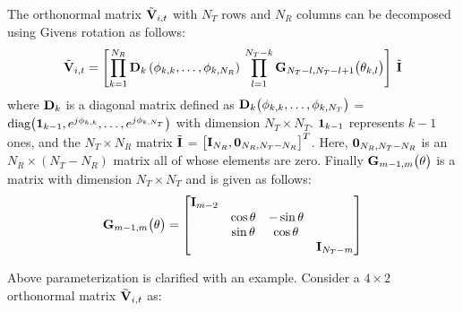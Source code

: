 \documentclass[11pt,a4paper]{report}
\def\bD{{\bf D}}
\def\bG{{\bf G}}
\def\bI{{\bf I}}
\def\bV{{\bf V}}
\begin{document}
The orthonormal matrix $\tilde{\bV}_{i,t}$ with $N_T$ rows and $N_R$ columns
can be decomposed using Givens rotation as follows:
\begin{equation}
\label{eq:decompose}
\tilde{\bV}_{i,t} = \left[\prod_{k=1}^{N_{R}} \bD_{k} \left( \phi_{k,k},\ldots , \phi_{k,N_{R}} \right) \:  \prod_{l=1}^{N_{T}-k} \bG_{N_{T}-l,N_{T} -l+1} \big( \theta_{k,l}\big)  \right] \: \tilde{\bI}
\end{equation}
where $\bD_{k}$ is a diagonal matrix defined as
$\bD_{k}\big(\phi_{k,k}, \ldots, \phi_{k,N_T } \big)$ =
$\mbox{diag}\big( {\bf 1}_{k-1}, e^{j\phi_{k,k}},\ldots,
e^{j\phi_{k,N_T }} \big)$ with  dimension $N_T \times N_T$. ${\bf 1}_{k-1}$ represents $k-1$ ones,
and the $N_T \times N_R$ matrix $\tilde{\bI}$ =
$\big[\bI_{N_R }, {\bf 0}_{N_R ,N_T -N_R}\big]^{T}$. Here,
${\bf 0}_{N_R ,N_T -N_R }$ is an $N_R\times (N_T - N_R)$ matrix all of
whose elements are zero.
Finally $\bG_{m-1,m}\big(\theta\big)$ is a matrix with dimension $N_T \times N_T$ and is given as follows:
\begin{equation}
\bG_{m-1,m}\big(\theta\big)  =
\begin{bmatrix}
\bI_{m-2} & & & \\
& \cos\theta & -\sin\theta & \\
& \sin\theta & \cos\theta & \\
& & & \bI_{N_T -m}
\end{bmatrix}
\end{equation}

Above parameterization is clarified with an example. Consider a $4 \times 2$ 
orthonormal matrix $\tilde{\bV}_{i,t}$ as:
\end{document}
